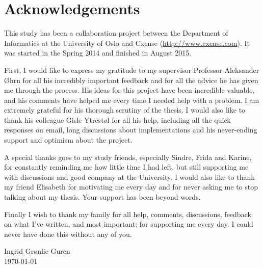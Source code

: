 \chapter*{Acknowledgements}
This study has been a collaboration project between the Department of Informatics at the University of Oslo and Cxense (\url{http://www.cxense.com}). It was started in the Spring 2014 and finished in August 2015. 

First, I would like to express my gratitude to my supervisor Professor Aleksander Øhrn for all his incredibly important feedback and for all the advice he has given me through the process. 
His ideas for this project have been incredible valuable, and his comments have helped me every time I needed help with a problem. I am extremely grateful for his thorough scrutiny of the thesis. 
I would also like to thank his colleague Gisle Ytrestøl for all his help, including all the quick responses on email, long discussions about implementations and his never-ending support and optimism about the project. 

A special thanks goes to my study friends, 
especially Sindre, Frida and Karine, 
for constantly reminding me how little time I had left, but still supporting me with discussions and good company at the University. I would also like to thank my friend Elisabeth for motivating me every day and for never asking me to stop talking about my thesis. Your support has been beyond words.

Finally I wish to thank my family for all help, comments, discussions, feedback on what I've written, and most important; for supporting me every day. I could never have done this without any of you. 


\begin{flushright}
Ingrid Grønlie Guren\\
\today
\end{flushright}
